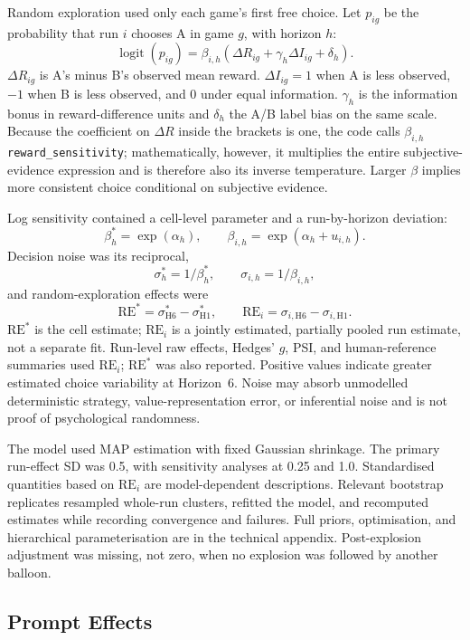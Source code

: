 \documentclass[logo,msc]{infthesis}
\begin{document}
Random exploration used only each game's first free choice. Let $p_{ig}$ be the probability that run $i$ chooses A in game $g$, with horizon $h$:
\[
\operatorname{logit}(p_{ig})=\beta_{i,h}\left(\Delta R_{ig}+\gamma_h\Delta I_{ig}+\delta_h\right).
\]
$\Delta R_{ig}$ is A's minus B's observed mean reward. $\Delta I_{ig}=1$ when A is less observed, $-1$ when B is less observed, and $0$ under equal information. $\gamma_h$ is the information bonus in reward-difference units and $\delta_h$ the A/B label bias on the same scale. Because the coefficient on $\Delta R$ inside the brackets is one, the code calls $\beta_{i,h}$ \texttt{reward\_sensitivity}; mathematically, however, it multiplies the entire subjective-evidence expression and is therefore also its inverse temperature. Larger $\beta$ implies more consistent choice conditional on subjective evidence.

Log sensitivity contained a cell-level parameter and a run-by-horizon deviation:
\[
\beta_h^{*}=\exp(\alpha_h),\qquad \beta_{i,h}=\exp(\alpha_h+u_{i,h}).
\]
Decision noise was its reciprocal,
\[
\sigma_h^{*}=1/\beta_h^{*},\qquad \sigma_{i,h}=1/\beta_{i,h},
\]
and random-exploration effects were
\[
\mathrm{RE}^{*}=\sigma_{\mathrm{H6}}^{*}-\sigma_{\mathrm{H1}}^{*},\qquad
\mathrm{RE}_{i}=\sigma_{i,\mathrm{H6}}-\sigma_{i,\mathrm{H1}}.
\]
$\mathrm{RE}^{*}$ is the cell estimate; $\mathrm{RE}_{i}$ is a jointly estimated, partially pooled run estimate, not a separate fit. Run-level raw effects, Hedges' $g$, PSI, and human-reference summaries used $\mathrm{RE}_{i}$; $\mathrm{RE}^{*}$ was also reported. Positive values indicate greater estimated choice variability at Horizon~6. Noise may absorb unmodelled deterministic strategy, value-representation error, or inferential noise and is not proof of psychological randomness.

The model used MAP estimation with fixed Gaussian shrinkage. The primary run-effect SD was 0.5, with sensitivity analyses at 0.25 and 1.0. Standardised quantities based on $\mathrm{RE}_{i}$ are model-dependent descriptions. Relevant bootstrap replicates resampled whole-run clusters, refitted the model, and recomputed estimates while recording convergence and failures. Full priors, optimisation, and hierarchical parameterisation are in the technical appendix. Post-explosion adjustment was missing, not zero, when no explosion was followed by another balloon.

\subsection{Prompt Effects}
\end{document}
